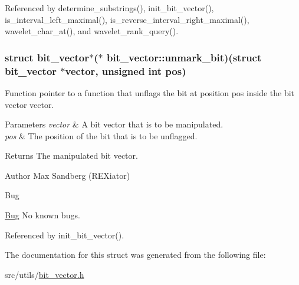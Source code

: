 \-Referenced by determine\-\_\-substrings(), init\-\_\-bit\-\_\-vector(), is\-\_\-interval\-\_\-left\-\_\-maximal(), is\-\_\-reverse\-\_\-interval\-\_\-right\-\_\-maximal(), wavelet\-\_\-char\-\_\-at(), and wavelet\-\_\-rank\-\_\-query().

\hypertarget{structbit__vector_a63fceb0ab2c93f5d73f71bf156496716}{
\subsubsection[{unmark\-\_\-bit}]{\setlength{\rightskip}{0pt plus 5cm}struct {\bf bit\-\_\-vector}$\ast$($\ast$ {\bf bit\-\_\-vector\-::unmark\-\_\-bit})(struct {\bf bit\-\_\-vector} $\ast$vector, unsigned int pos)}}\label{structbit__vector_a63fceb0ab2c93f5d73f71bf156496716}


\-Function pointer to a function that unflags the bit at position {\ttfamily pos} inside the bit vector {\ttfamily vector}. 


\begin{DoxyParams}{\-Parameters}
{\em vector} & \-A bit vector that is to be manipulated. \\
\hline
{\em pos} & \-The position of the bit that is to be unflagged. \\
\hline
\end{DoxyParams}
\begin{DoxyReturn}{\-Returns}
\-The manipulated bit vector. 
\end{DoxyReturn}
\begin{DoxyAuthor}{\-Author}
\-Max \-Sandberg (\-R\-E\-Xiator) 
\end{DoxyAuthor}
\begin{DoxyRefDesc}{\-Bug}
\item[\hyperlink{bug__bug000111}{\-Bug}]\-No known bugs. \end{DoxyRefDesc}


\-Referenced by init\-\_\-bit\-\_\-vector().



\-The documentation for this struct was generated from the following file\-:\begin{DoxyCompactItemize}
\item 
src/utils/\hyperlink{bit__vector_8h}{bit\-\_\-vector.\-h}\end{DoxyCompactItemize}
